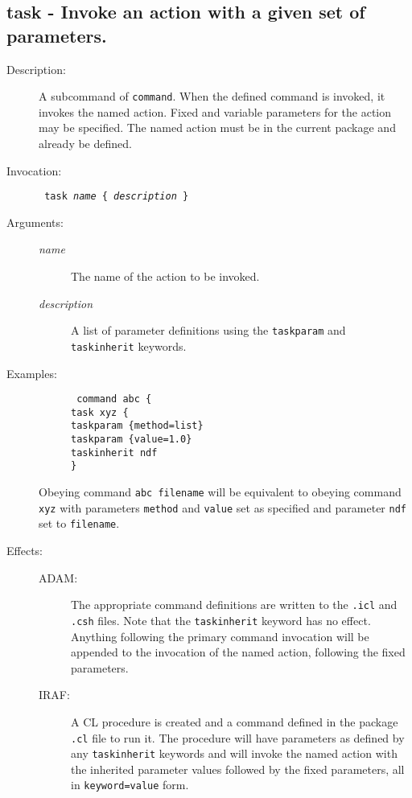 \documentclass[twoside,11pt]{article}
\newcommand{\htmlref}[2]{#1}
\newcommand{\xlabel}[1]{}
\newcommand{\tab}{\>}
\renewcommand{\tab}{   }
\newlength{\sstbannerlength}
\newlength{\sstcaptionlength}
\newlength{\sstexampleslength}
\newlength{\sstexampleswidth}
\newcommand{\sstroutine}[3]{
   \goodbreak
   \rule{\textwidth}{0.5mm}
   \vspace{-7ex}
   \newline
   \settowidth{\sstbannerlength}{{\Large {\bf #1}}}
   \setlength{\sstcaptionlength}{\textwidth}
   \setlength{\sstexampleslength}{\textwidth}
   \addtolength{\sstbannerlength}{0.5em}
   \addtolength{\sstcaptionlength}{-2.0\sstbannerlength}
   \addtolength{\sstcaptionlength}{-5.0pt}
   \settowidth{\sstexampleswidth}{{\bf Examples:}}
   \addtolength{\sstexampleslength}{-\sstexampleswidth}
   \parbox[t]{\sstbannerlength}{\flushleft{\Large {\bf #1}}}
   \parbox[t]{\sstcaptionlength}{\center{\Large #2}}
   \parbox[t]{\sstbannerlength}{\flushright{\Large {\bf #1}}}
   \begin{description}
      #3
   \end{description}
}
\newcommand{\sstdescription}[1]{\item[Description:] #1}
\newcommand{\sstinvocation}[1]{\item[Invocation:]\hspace{0.4em}{\tt #1}}
\newcommand{\ssteffects}[1]{
   \item[Effects:] \mbox{} \\
   \vspace{-3.5ex}
   \begin{description}
      #1
   \end{description}
}
\newcommand{\sstarguments}[1]{
   \item[Arguments:] \mbox{} \\
   \vspace{-3.5ex}
   \begin{description}
      #1
   \end{description}
}
\newcommand{\sstexamples}[1]{
   \item[Examples:] \mbox{}
      #1
}
\newcommand{\sstsubsection}[1]{ \item[{#1}] \mbox{} \\}
\newcommand{\sstexamplesubsection}[2]
{   \vspace{-5ex}
\begin{quote} \texttt{\begin{tabbing}
xxx\=xxx\=\kill
#1
\end{tabbing}}
\end{quote}
#2}
\newcommand{\ssttt}{\tt}
\renewcommand{\sstroutine}[3]{
      \subsection{#1\xlabel{#1}-\label{#1}#2}
      \begin{description}
         #3
      \end{description}
   }
\renewcommand{\sstdescription}[1]{\item[Description:]
      \begin{description}
         #1
      \end{description}
   }
\renewcommand{\sstinvocation}[1]{\item[Invocation:]
      \begin{description}
         {\ssttt #1}
      \end{description}
   }
\renewcommand{\ssteffects}[1]{
      \item[Effects:]
      \begin{description}
         #1
      \end{description}
   }
\renewcommand{\sstarguments}[1]{
      \item[Arguments:]
      \begin{description}
         #1
      \end{description}
   }
\renewcommand{\sstexamples}[1]{
      \item[Examples:]
      \begin{description}
         #1
      \end{description}
   }
\renewcommand{\sstsubsection}[1]{\item[{#1}]}
\renewcommand{\sstexamplesubsection}[2]{\item[] {\ssttt #1} \\ \item[#2]}
\begin{document}
\sstroutine{
   task
}{
      Invoke an action with a given set of parameters.
}{
   \sstdescription{
      A subcommand of 
      \htmlref{\texttt{command}}{command}.
      When the defined command is invoked, it
      invokes the named action. Fixed and variable parameters for the
      action may be specified. The named action must be in the current
      package and already be defined.

   }
   \sstinvocation{
      task \textit{name} \{ \textit{description} \}
   }
   \sstarguments{
      \sstsubsection{
         \textit{name}
      }{
         The name of the action to be invoked.
      }
      \sstsubsection{
         \textit{description}
      }{
         A list of parameter definitions using the
         \htmlref{{\ssttt taskparam}}{taskparam} and
         \htmlref{{\ssttt taskinherit}}{taskinherit} keywords.
      }
   }
   \sstexamples{
      \sstexamplesubsection{
         command abc \{\\
         \tab task xyz \{\\
         \tab \tab taskparam \{method=list\}\\
         \tab \tab taskparam \{value=1.0\}\\
         \tab \tab taskinherit ndf\\
         \}
      }{
         Obeying command {\ssttt abc filename} will be equivalent to obeying
         command {\ssttt xyz} with parameters {\ssttt method} and 
         {\ssttt value} set as specified and parameter {\ssttt ndf} set to 
         {\ssttt filename}.
      }
   }
   \ssteffects{
      \sstsubsection{ADAM:}
         {The appropriate command definitions are written to the \texttt{.icl}
          and \texttt{.csh} files. Note that the {\ssttt taskinherit} keyword
          has no effect. Anything following the primary command invocation
          will be appended to the invocation of the named action,
          following the fixed parameters.}
      \sstsubsection{IRAF:}{A CL procedure is created and a command defined in
          the package \texttt{.cl} file to run it. The procedure will have
          parameters as defined by any
          \htmlref{{\ssttt taskinherit}}{taskinherit} 
          keywords and will invoke the named action with the inherited
          parameter values followed by the fixed parameters, all in
          {\ssttt keyword=value} form.
      }
   }
}
\end{document}
